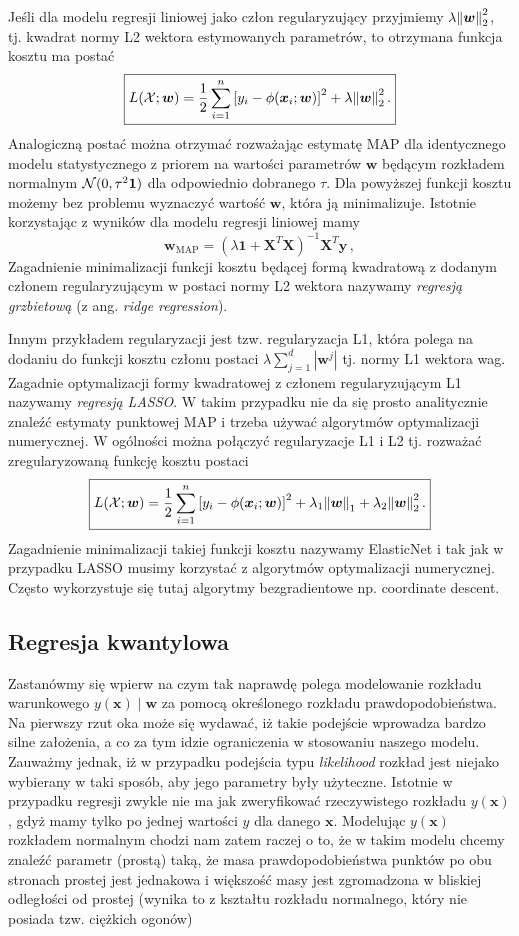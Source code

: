 \documentclass{myclass}
\numberwithin{equation}{subsection}
\begin{document}
Jeśli dla modelu regresji liniowej jako człon regularyzujący przyjmiemy \(\lambda
\norm{\bm{w}}_2^2\), tj. kwadrat normy L2 wektora estymowanych parametrów, to otrzymana funkcja
kosztu ma postać
\[
\boxed{
L(\mathcal{X}; \bm{w}) = \frac{1}{2}\sum_{i=1}^n \left[y_i - \phi(\bm{x}_i; \bm{w})\right]^2 + \lambda \norm{\bm{w}}_2^2\,.
}
\]
Analogiczną postać można otrzymać rozważając estymatę MAP dla identycznego modelu statystycznego z
priorem na wartości parametrów \(\bm{w}\) będącym rozkładem normalnym \(\mathcal{N}(0, \tau^2\bm{1})\)
dla odpowiednio dobranego \(\tau\). Dla powyższej funkcji kosztu możemy bez problemu wyznaczyć
wartość \(\bm{w}\), która ją minimalizuje. Istotnie korzystając z wyników dla modelu regresji
liniowej mamy
\[
\bm{w}_\mathrm{MAP} = \left(\lambda \bm{1} + \bm{X}^T\bm{X}\right)^{-1}\bm{X}^T\bm{y}\,,
\]
Zagadnienie minimalizacji funkcji kosztu będącej formą kwadratową z dodanym członem regularyzującym
w postaci normy L2 wektora nazywamy \emph{regresją grzbietową} (z ang. \textit{ridge regression}).

Innym przykładem regularyzacji jest tzw. regularyzacja L1, która polega na dodaniu do funkcji kosztu
członu postaci \(\lambda \sum_{j=1}^d |\bm{w}^j|\) tj. normy L1 wektora wag. Zagadnie optymalizacji
formy kwadratowej z członem regularyzującym L1 nazywamy \emph{regresją LASSO}. W takim przypadku nie
da się prosto analitycznie znaleźć estymaty punktowej MAP i trzeba używać algorytmów optymalizacji
numerycznej. W ogólności można połączyć regularyzacje L1 i L2 tj. rozważać zregularyzowaną funkcję
kosztu postaci
\[
\boxed{
L(\mathcal{X};\bm{w}) = \frac{1}{2}\sum_{i=1}^n \left[y_i - \phi(\bm{x}_i;\bm{w})\right]^2 + \lambda_1\norm{\bm{w}}_1 +  \lambda_2\norm{\bm{w}}_2^2\,.
}
\]
Zagadnienie minimalizacji takiej funkcji kosztu nazywamy ElasticNet i tak jak w przypadku LASSO
musimy korzystać z algorytmów optymalizacji numerycznej. Często wykorzystuje się tutaj algorytmy
bezgradientowe np. coordinate descent.


\subsection{Regresja kwantylowa}

Zastanówmy się wpierw na czym tak naprawdę polega modelowanie rozkładu warunkowego \(y(\bm{x}) \mid
\bm{w}\) za pomocą określonego rozkładu prawdopodobieństwa. Na pierwszy rzut oka może się wydawać,
iż takie podejście wprowadza bardzo silne założenia, a co za tym idzie ograniczenia w stosowaniu
naszego modelu. Zauważmy jednak, iż w przypadku podejścia typu \textit{likelihood} rozkład jest
niejako wybierany w taki sposób, aby jego parametry były użyteczne. Istotnie w przypadku regresji
zwykle nie ma jak zweryfikować rzeczywistego rozkładu \(y(\bm{x})\), gdyż mamy tylko po jednej
wartości \(y\) dla danego \(\bm{x}\). Modelując \(y(\bm{x})\) rozkładem normalnym chodzi nam zatem
raczej o to, że w takim modelu chcemy znaleźć parametr (prostą) taką, że masa prawdopodobieństwa
punktów po obu stronach prostej jest jednakowa i większość masy jest zgromadzona w bliskiej
odległości od prostej (wynika to z kształtu rozkładu normalnego, który nie posiada tzw. ciężkich
ogonów)
\end{document}
